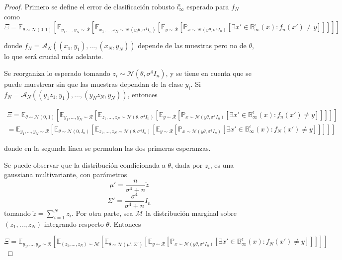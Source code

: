 \begin{proof}
Primero se define el error de clasificación robusto $l_{\infty}^\epsilon$ esperado para $f_N$ como
$$\Xi = \mathbb{E}_{\theta \sim \mathcal{N}(0,1)} \left[ \mathbb{E}_{y_1,\ldots,y_N \sim \mathcal{R}} \left[ \mathbb{E}_{x_1,\ldots,x_N \sim \mathcal{N}(y_i \theta, \sigma^4 I_n)} \left[ \mathbb{E}_{y \sim \mathcal{R}} \left[ \mathbb{P}_{x \sim \mathcal{N}(y \theta,\sigma^4 I_n)} [ \exists x' \in \mathbb{B}_{\infty}^\epsilon (x): f_n(x') \neq y ] \right] \right] \right] \right]$$

donde $f_N=\mathcal{A}_N((x_1,y_1),\ldots,(x_N,y_N))$ depende de las muestras pero no de $\theta$, lo que será crucial más adelante.

Se reorganiza lo esperado tomando $z_i \sim \mathcal{N}(\theta,\sigma^4 I_n)$, y se tiene en cuenta que se puede muestrear sin que las muestras dependan de la clase $y_i$. Si $f_N=\mathcal{A}_N((y_1 z_1,y_1),\ldots,(y_N z_N, y_N))$, entonces

\begin{multline}
\Xi = \mathbb{E}_{\theta \sim \mathcal{N}(0,1)} \left[ \mathbb{E}_{y_1,\ldots,y_N \sim \mathcal{R}} \left[ \mathbb{E}_{z_1,\ldots,z_N \sim \mathcal{N}(\theta, \sigma^4 I_n)} \left[ \mathbb{E}_{y \sim \mathcal{R}} \left[ \mathbb{P}_{x \sim \mathcal{N}(y \theta,\sigma^4 I_n)} [ \exists x' \in \mathbb{B}_{\infty}^\epsilon (x): f_n(x') \neq y ] \right] \right] \right] \right]  \\
= \mathbb{E}_{y_1,\ldots,y_N \sim \mathcal{R}} \left[ \mathbb{E}_{\theta \sim \mathcal{N}(0,I_n)} \left[ \mathbb{E}_{z_1,\ldots,z_N \sim \mathcal{N}(\theta,\sigma^4 I_n)} \left[ \mathbb{E}_{y \sim \mathcal{R}} \left[ \mathbb{P}_{x \sim \mathcal{N}(y \theta,\sigma^4 I_n)} [\exists x' \in \mathbb{B}_{\infty}^\epsilon (x): f_N(x') \neq y] \right] \right] \right] \right]
\end{multline}

donde en la segunda línea se permutan las dos primeras esperanzas.

Se puede observar que la distribución condicionada a $\theta$, dada por $z_i$, es una gaussiana multivariante, con parámetros
$$\mu' = \frac{n}{\sigma^4 + n} \tilde{z}$$
$$\Sigma' = \frac{\sigma^4}{\sigma^4 + n}I_n$$
tomando $\tilde{z} = \sum_{i=1}^N z_i$. Por otra parte, sea $\mathcal{M}$ la distribución marginal sobre $(z_1,\ldots,z_N)$ integrando respecto $\theta$. Entonces

$$\Xi = \mathbb{E}_{y_1,\ldots,y_N \sim \mathcal{R}} \left[ \mathbb{E}_{(z_1,\ldots,z_N) \sim \mathcal{M}} \left[ \mathbb{E}_{\theta \sim \mathcal{N}(\mu',\Sigma')} \left[ \mathbb{E}_{y \sim \mathcal{R}} \left[ \mathbb{P}_{x \sim \mathcal{N}(y \theta,\sigma^4 I_n)} [\exists x' \in \mathbb{B}_{\infty}^\epsilon (x) : f_N(x') \neq y] \right] \right] \right] \right]$$


\end{proof}
